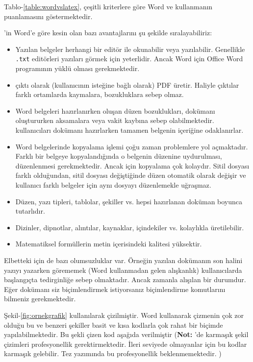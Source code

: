 Tablo-\ref{table:wordvslatex},  çeşitli kriterlere göre Word ve \latex kullanmanın puanlamasını göstermektedir. 

\latexx'in Word'e göre kesin olan bazı avantajlarını şu şekilde sıralayabiliriz:

\begin{itemize}
    \item Yazılan belgeler herhangi bir editör ile okunabilir veya yazılabilir. Genellikle \texttt{.txt} editörleri yazıları görmek için yeterlidir. Ancak Word için Office Word programının yüklü olması gerekmektedir.
    \item \latex çıktı olarak (kullanıcının isteğine bağlı olarak) PDF üretir. Haliyle çıktılar farklı ortamlarda kaymalara, bozukluklara sebep olmaz. 
    \item Word belgeleri hazırlanırken oluşan düzen bozuklukları, dokümanı oluştururken aksamalara veya vakit kaybına sebep olabilmektedir. \latex kullanıcıları dokümanı hazırlarken tamamen belgenin içeriğine odaklanırlar.
    \item Word belgelerinde kopyalama işlemi çoğu zaman problemlere yol açmaktadır. Farklı bir belgeye kopyalandığında o belgenin düzenine uydurulması, düzenlenmesi gerekmektedir. Ancak \latex için kopyalama çok kolaydır. Sitil dosyası farklı olduğundan, sitil dosyası değiştiğinde düzen otomatik olarak değişir ve kullanıcı farklı belgeler için aynı dosyayı düzenlemekle uğraşmaz.
    \item Düzen, yazı tipleri, tablolar, şekiller vs. hepsi hazırlanan doküman boyunca tutarlıdır.
    \item Dizinler, dipnotlar, alıntılar, kaynaklar, içindekiler vs. kolaylıkla üretilebilir.
    \item Matematiksel formüllerin metin içerisindeki kalitesi yüksektir.
\end{itemize}

Elbetteki \latex için de bazı olumsuzluklar var. Örneğin yazılan dokümanın son halini yazıyı yazarken görememek (Word kullanmadan gelen alışkanlık) kullanıcılarda başlangıçta tedirginliğe sebep olmaktadır. Ancak zamanla alışılan bir durumdur. Eğer dokümanı siz biçimlendirmek istiyorsanız biçimlendirme komutlarını bilmeniz gerekmektedir. 

Şekil-\ref{fig:ornekgrafik} \latex kullanılarak çizilmiştir. Word kullanarak çizmenin çok zor olduğu bu ve benzeri şekiller basit ve kısa kodlarla çok rahat bir biçimde yapılabilmektedir. Bu şekli çizen kod aşağıda verilmiştir (\textbf{Not:} \latexx'de karmaşık şekil çizimleri profesyonellik gerektirmektedir. İleri seviyede olmayanlar için bu kodlar karmaşık gelebilir. Tez yazımında bu profesyonellik beklenmemektedir. )

